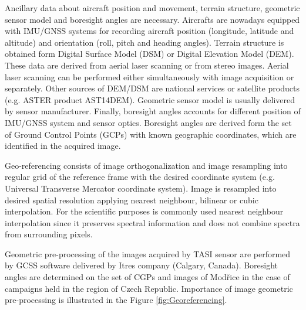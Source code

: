 Ancillary data about aircraft position and movement, terrain structure, geometric sensor model and boresight angles are necessary. Aircrafts are nowadays equipped with IMU/GNSS systems for recording aircraft position (longitude, latitude and altitude) and orientation (roll, pitch and heading angles). Terrain structure is obtained form Digital Surface Model (DSM) or Digital Elevation Model (DEM). These data are derived from aerial laser scanning or from stereo images. Aerial laser scanning can be performed either simultaneously with image acquisition or separately. Other sources of DEM/DSM are national services or satellite products (e.g. ASTER product AST14DEM). Geometric sensor model is usually delivered by sensor manufacturer. Finally, boresight angles accounts for different position of IMU/GNSS system and sensor optics. Boresight angles are derived form the set of Ground Control Points (GCPs) with known geographic coordinates, which are identified in the acquired image.

Geo-referencing consists of image orthogonalization and image resampling into regular grid of the reference frame with the desired coordinate system (e.g. Universal Transverse Mercator coordinate system). Image is resampled into desired spatial resolution applying nearest neighbour, bilinear or cubic interpolation. For the scientific purposes is commonly used nearest neighbour interpolation since it preserves spectral information and does not combine spectra from surrounding pixels.

Geometric pre-processing of the images acquired by TASI sensor are performed by GCSS software \cite{software:GCSS} delivered by Itres company (Calgary, Canada). Boresight angles are determined on the set of CGPs and images of Modřice in the case of campaigns held in the region of Czech Republic. Importance of image geometric pre-processing is illustrated in the Figure \ref{fig:Georeferencing}. 

